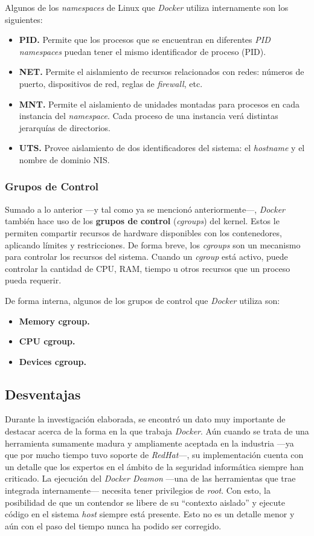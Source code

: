 \documentclass[12pt, letterpaper]{article}
\begin{document}
Algunos de los \textit{namespaces} de Linux que \textit{Docker} utiliza 
internamente son los siguientes:
\begin{itemize}
  \item \textbf{PID.} Permite que los procesos que se encuentran en diferentes 
    \textit{PID namespaces} puedan tener el mismo identificador de proceso 
    (PID).
  \item \textbf{NET.} Permite el aislamiento de recursos relacionados con 
    redes: números de puerto, dispositivos de red, reglas de 
    \textit{firewall}, etc.
  \item \textbf{MNT.} Permite el aislamiento de unidades montadas para 
    procesos en cada instancia del \textit{namespace}. Cada proceso de una 
    instancia verá distintas jerarquías de directorios.
  \item \textbf{UTS.} Provee aislamiento de dos identificadores del sistema: 
    el \textit{hostname} y el nombre de dominio NIS.
\end{itemize}

\subsubsection{Grupos de Control}
Sumado a lo anterior ---y tal como ya se mencionó anteriormente---, 
\textit{Docker} también hace uso de los \textbf{grupos de control} 
(\textit{cgroups}) del kernel.  Estos le permiten compartir recursos de 
hardware disponibles con los contenedores, aplicando límites y restricciones.  
De forma breve, los \textit{cgroups} son un mecanismo para controlar los 
recursos del sistema. Cuando un \textit{cgroup} está activo, puede controlar 
la cantidad de CPU, RAM, tiempo u otros recursos que un proceso pueda 
requerir.

De forma interna, algunos de los grupos de control que \textit{Docker} utiliza 
son:
\begin{itemize}
  \item \textbf{Memory cgroup.}
  \item \textbf{CPU cgroup.}
  \item \textbf{Devices cgroup.}
\end{itemize}

\subsection{Desventajas}
Durante la investigación elaborada, se encontró un dato muy importante de 
destacar acerca de la forma en la que trabaja \textit{Docker}. Aún cuando se 
trata de una herramienta sumamente madura y ampliamente aceptada en la 
industria ---ya que por mucho tiempo tuvo soporte de \textit{RedHat}---, su 
implementación cuenta con un detalle que los expertos en el ámbito de la 
seguridad informática siempre han criticado. La ejecución del \textit{Docker 
Deamon} ---una de las herramientas que trae integrada internamente--- necesita 
tener privilegios de \textit{root}. Con esto, la posibilidad de que un 
contendor se libere de su ``contexto aislado'' y ejecute código en el sistema 
\textit{host} siempre está presente. Esto no es un detalle menor y aún con el 
paso del tiempo nunca ha podido ser corregido.
\end{document}
